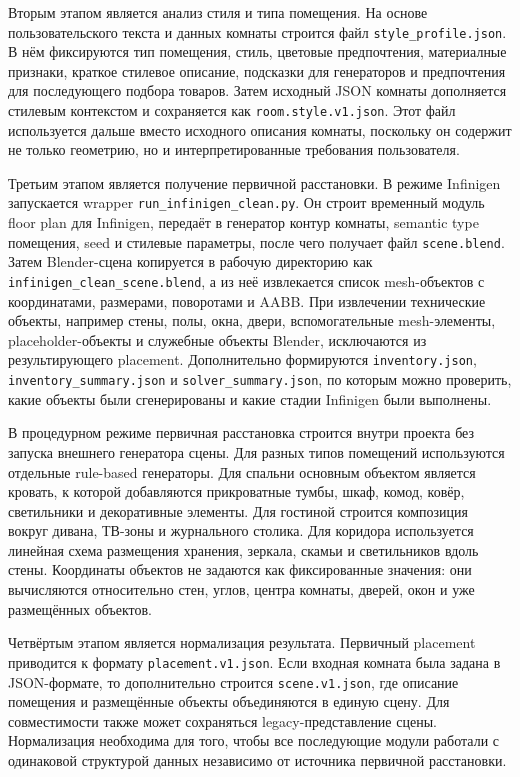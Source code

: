 \documentclass[times]{itmo-student-thesis}
\begin{document}
Вторым этапом является анализ стиля и типа помещения. На основе пользовательского текста и данных комнаты строится файл \texttt{style\_profile.json}. В нём фиксируются тип помещения, стиль, цветовые предпочтения, материалные признаки, краткое стилевое описание, подсказки для генераторов и предпочтения для последующего подбора товаров. Затем исходный JSON комнаты дополняется стилевым контекстом и сохраняется как \texttt{room.style.v1.json}. Этот файл используется дальше вместо исходного описания комнаты, поскольку он содержит не только геометрию, но и интерпретированные требования пользователя.

Третьим этапом является получение первичной расстановки. В режиме Infinigen запускается wrapper \texttt{run\_infinigen\_clean.py}. Он строит временный модуль floor plan для Infinigen, передаёт в генератор контур комнаты, semantic type помещения, seed и стилевые параметры, после чего получает файл \texttt{scene.blend}. Затем Blender-сцена копируется в рабочую директорию как \texttt{infinigen\_clean\_scene.blend}, а из неё извлекается список mesh-объектов с координатами, размерами, поворотами и AABB. При извлечении технические объекты, например стены, полы, окна, двери, вспомогательные mesh-элементы, placeholder-объекты и служебные объекты Blender, исключаются из результирующего placement. Дополнительно формируются \texttt{inventory.json}, \texttt{inventory\_summary.json} и \texttt{solver\_summary.json}, по которым можно проверить, какие объекты были сгенерированы и какие стадии Infinigen были выполнены.

В процедурном режиме первичная расстановка строится внутри проекта без запуска внешнего генератора сцены. Для разных типов помещений используются отдельные rule-based генераторы. Для спальни основным объектом является кровать, к которой добавляются прикроватные тумбы, шкаф, комод, ковёр, светильники и декоративные элементы. Для гостиной строится композиция вокруг дивана, ТВ-зоны и журнального столика. Для коридора используется линейная схема размещения хранения, зеркала, скамьи и светильников вдоль стены. Координаты объектов не задаются как фиксированные значения: они вычисляются относительно стен, углов, центра комнаты, дверей, окон и уже размещённых объектов.

Четвёртым этапом является нормализация результата. Первичный placement приводится к формату \texttt{placement.v1.json}. Если входная комната была задана в JSON-формате, то дополнительно строится \texttt{scene.v1.json}, где описание помещения и размещённые объекты объединяются в единую сцену. Для совместимости также может сохраняться legacy-представление сцены. Нормализация необходима для того, чтобы все последующие модули работали с одинаковой структурой данных независимо от источника первичной расстановки.
\end{document}

